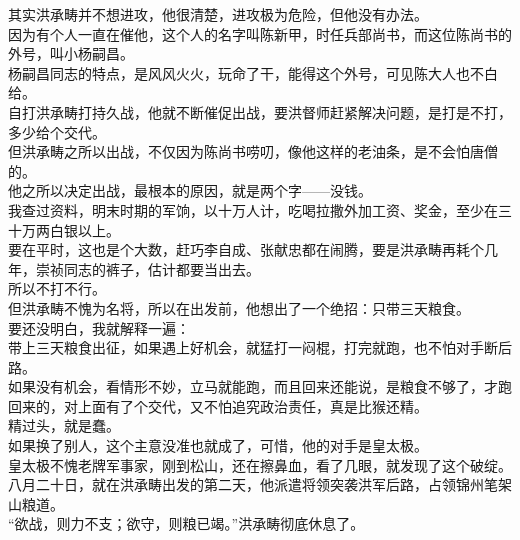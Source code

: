 \begin{multicols}{\theparacolNo}
其实洪承畴并不想进攻，他很清楚，进攻极为危险，但他没有办法。\\

因为有个人一直在催他，这个人的名字叫陈新甲，时任兵部尚书，而这位陈尚书的外号，叫小杨嗣昌。\\

杨嗣昌同志的特点，是风风火火，玩命了干，能得这个外号，可见陈大人也不白给。\\

自打洪承畴打持久战，他就不断催促出战，要洪督师赶紧解决问题，是打是不打，多少给个交代。\\

但洪承畴之所以出战，不仅因为陈尚书唠叨，像他这样的老油条，是不会怕唐僧的。\\

他之所以决定出战，最根本的原因，就是两个字——没钱。\\

我查过资料，明末时期的军饷，以十万人计，吃喝拉撒外加工资、奖金，至少在三十万两白银以上。\\

要在平时，这也是个大数，赶巧李自成、张献忠都在闹腾，要是洪承畴再耗个几年，崇祯同志的裤子，估计都要当出去。\\

所以不打不行。\\

但洪承畴不愧为名将，所以在出发前，他想出了一个绝招：只带三天粮食。\\

要还没明白，我就解释一遍：\\

带上三天粮食出征，如果遇上好机会，就猛打一闷棍，打完就跑，也不怕对手断后路。\\

如果没有机会，看情形不妙，立马就能跑，而且回来还能说，是粮食不够了，才跑回来的，对上面有了个交代，又不怕追究政治责任，真是比猴还精。\\

精过头，就是蠢。\\

如果换了别人，这个主意没准也就成了，可惜，他的对手是皇太极。\\

皇太极不愧老牌军事家，刚到松山，还在擦鼻血，看了几眼，就发现了这个破绽。\\

八月二十日，就在洪承畴出发的第二天，他派遣将领突袭洪军后路，占领锦州笔架山粮道。\\

“欲战，则力不支；欲守，则粮已竭。”洪承畴彻底休息了。\\


\end{multicols}
